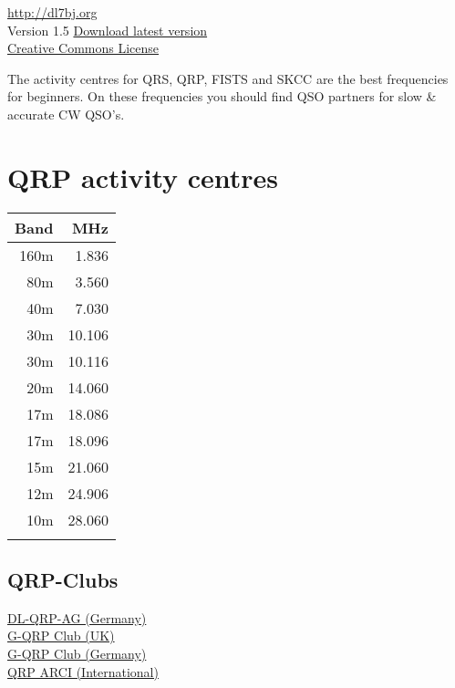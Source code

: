 \documentclass[10pt]{article}
\begin{document}
\begin{multicols}{3}
\vspace{1cm}
\noindent \thedate{} \theauthor{} \href{http://dl7bj.org}{http://dl7bj.org} \\
Version 1.5 \href{https://github.com/DL7BJ/CW-Refcard/raw/master/cw-refcard.pdf}{Download latest version}\\
\ccbyncsa \hspace{0.5cm} \href{http://creativecommons.org/licenses/by-nc-sa/4.0}{Creative Commons License} \\

\newpage

The activity centres for QRS, QRP, FISTS and SKCC are the best frequencies for beginners.
On these frequencies you should find QSO partners for slow \& accurate CW QSO's.

\section{QRP activity centres}
\vspace{\baselineskip}
\begin{tabular}{rr}
Band & MHz\\ \hline 
160m & 1.836\\
 80m & 3.560\\
 40m & 7.030\\
 30m & 10.106\\
 30m & 10.116\\
 20m & 14.060\\
 17m & 18.086\\
 17m & 18.096\\
 15m & 21.060\\
 12m & 24.906\\
 10m & 28.060\\
     &       \\
\end{tabular}

\subsection{QRP-Clubs}
\href{http://www.dl-qrp-ag.de}{DL-QRP-AG (Germany)}\\
\href{http://www.gqrp.com}{G-QRP Club (UK)}\\
\href{http://www.g-qrp-dl.de}{G-QRP Club (Germany)}\\
\href{http://www.qrparci.org}{QRP ARCI (International)}\\


\end{multicols}
\end{document}
